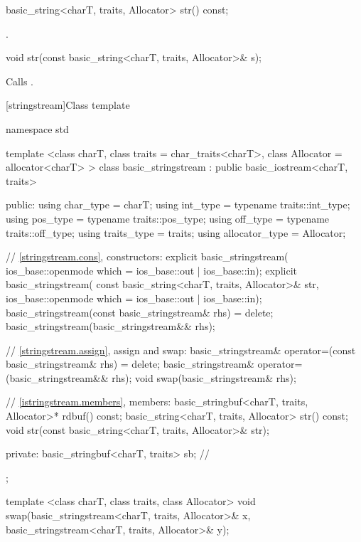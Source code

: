 %
\begin{itemdecl}
basic_string<charT, traits, Allocator> str() const;
\end{itemdecl}

\begin{itemdescr}
\pnum
\returns
{}.
\end{itemdescr}

%
%
\begin{itemdecl}
void str(const basic_string<charT, traits, Allocator>& s);
\end{itemdecl}

\begin{itemdescr}
\pnum
\effects
Calls
.
\end{itemdescr}

[stringstream]{Class template }

%
\begin{codeblock}
namespace std {
  template <class charT, class traits = char_traits<charT>,
            class Allocator = allocator<charT> >
  class basic_stringstream
    : public basic_iostream<charT, traits> {
  public:
    using char_type      = charT;
    using int_type       = typename traits::int_type;
    using pos_type       = typename traits::pos_type;
    using off_type       = typename traits::off_type;
    using traits_type    = traits;
    using allocator_type = Allocator;

    // \ref{stringstream.cons}, constructors:
    explicit basic_stringstream(
      ios_base::openmode which = ios_base::out | ios_base::in);
    explicit basic_stringstream(
      const basic_string<charT, traits, Allocator>& str,
      ios_base::openmode which = ios_base::out | ios_base::in);
    basic_stringstream(const basic_stringstream& rhs) = delete;
    basic_stringstream(basic_stringstream&& rhs);

    // \ref{stringstream.assign}, assign and swap:
    basic_stringstream& operator=(const basic_stringstream& rhs) = delete;
    basic_stringstream& operator=(basic_stringstream&& rhs);
    void swap(basic_stringstream& rhs);

    // \ref{istringstream.members}, members:
    basic_stringbuf<charT, traits, Allocator>* rdbuf() const;
    basic_string<charT, traits, Allocator> str() const;
    void str(const basic_string<charT, traits, Allocator>& str);

  private:
    basic_stringbuf<charT, traits> sb;  // \expos
  };

  template <class charT, class traits, class Allocator>
    void swap(basic_stringstream<charT, traits, Allocator>& x,
              basic_stringstream<charT, traits, Allocator>& y);
}
\end{codeblock}

